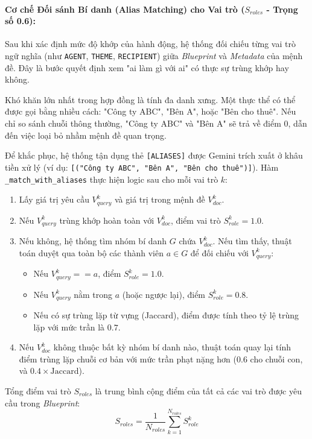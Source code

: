 \paragraph{Cơ chế Đối sánh Bí danh (Alias Matching) cho Vai trò ($S_{roles}$ - Trọng số 0.6):}
Sau khi xác định mức độ khớp của hành động, hệ thống đối chiếu từng vai trò ngữ nghĩa (như \texttt{AGENT}, \texttt{THEME}, \texttt{RECIPIENT}) giữa \textit{Blueprint} và \textit{Metadata} của mệnh đề. Đây là bước quyết định xem "ai làm gì với ai" có thực sự trùng khớp hay không.

Khó khăn lớn nhất trong hợp đồng là tính đa danh xưng. Một thực thể có thể được gọi bằng nhiều cách: "Công ty ABC", "Bên A", hoặc "Bên cho thuê". Nếu chỉ so sánh chuỗi thông thường, "Công ty ABC" và "Bên A" sẽ trả về điểm $0$, dẫn đến việc loại bỏ nhầm mệnh đề quan trọng.

Để khắc phục, hệ thống tận dụng thẻ \texttt{[ALIASES]} được Gemini trích xuất ở khâu tiền xử lý (ví dụ: \texttt{[("Công ty ABC", "Bên A", "Bên cho thuê")]}). Hàm \texttt{\_match\_with\_aliases} thực hiện logic sau cho mỗi vai trò $k$:
\begin{enumerate}
    \item Lấy giá trị yêu cầu $V_{query}^k$ và giá trị trong mệnh đề $V_{doc}^k$.
    \item Nếu $V_{query}^k$ trùng khớp hoàn toàn với $V_{doc}^k$, điểm vai trò $S_{role}^k = 1.0$.
    \item Nếu không, hệ thống tìm nhóm bí danh $G$ chứa $V_{doc}^k$. Nếu tìm thấy, thuật toán duyệt qua toàn bộ các thành viên $a \in G$ để đối chiếu với $V_{query}^k$:
    \begin{itemize}
        \item Nếu $V_{query}^k == a$, điểm $S_{role}^k = 1.0$.
        \item Nếu $V_{query}^k$ nằm trong $a$ (hoặc ngược lại), điểm $S_{role}^k = 0.8$.
        \item Nếu có sự trùng lặp từ vựng (Jaccard), điểm được tính theo tỷ lệ trùng lặp với mức trần là $0.7$.
    \end{itemize}
    \item Nếu $V_{doc}^k$ không thuộc bất kỳ nhóm bí danh nào, thuật toán quay lại tính điểm trùng lặp chuỗi cơ bản với mức trần phạt nặng hơn ($0.6$ cho chuỗi con, và $0.4 \times \text{Jaccard}$).
\end{enumerate}

Tổng điểm vai trò $S_{roles}$ là trung bình cộng điểm của tất cả các vai trò được yêu cầu trong \textit{Blueprint}:
\begin{equation}
    S_{roles} = \frac{1}{N_{roles}} \sum_{k=1}^{N_{roles}} S_{role}^k
\end{equation}

